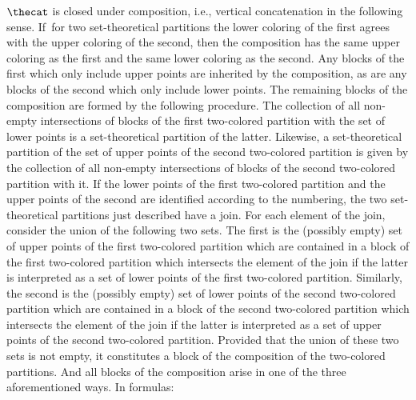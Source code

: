 \documentclass[pdftex]{sigma}
\numberwithin{equation}{section}
\begin{document}
\begin{Definition}
\begin{enumerate}
{\begin{enumerate}
{            \newcommand{\outcol}{\Yc{e}}
          \newcommand{\firstpartition}{p}
          \newcommand{\secondpartition}{q}
          \newcommand{\midsup}{s}
          \newcommand{\inblock}{\Yb{A}}
          \newcommand{\midblock}{B}
          \newcommand{\outblock}{\Yb{C}}
          \newcommand{\inind}{i}
          \newcommand{\outind}{j}
          $\thecat$ is closed under composition, i.e., vertical concatenation in the following sense. If~for two set-theoretical partitions   the lower coloring of the first agrees with the upper coloring of the second, then the composition has the same upper coloring as the first and the same lower coloring as the second. Any blocks of the first which only include upper points are inherited by the composition, as are any blocks of the second which only include lower points. The remaining blocks of the composition are formed by the following procedure. The collection of all non-empty intersections of  blocks of the first two-colored partition  with the set of lower points is a set-theoretical partition of the latter. Likewise, a set-theoretical partition of the set of upper points of the second two-colored partition is given by the collection of all non-empty intersections of blocks of the second two-colored partition with it.  If the lower points of the first two-colored partition and the upper points of the second are identified according to the numbering, the two set-theoretical partitions just described have a join. For each element of the join, consider the union  of the following two sets. The first is the (possibly empty) set of upper points of the first two-colored partition which are contained in a block of the first two-colored partition which intersects the element of the join if the latter is interpreted as a set of lower points of the first two-colored partition. Similarly, the second is the (possibly empty) set of lower points of the second two-colored partition which are contained in a block of the second two-colored partition which intersects the element of the join if the latter is interpreted as a set of upper points of the second two-colored partition. Provided that the union of these two sets is not empty, it constitutes a block of the composition of the two-colored partitions. And all blocks of the composition arise in one of the three aforementioned ways.
          In formulas:
}
\end{enumerate}}
\end{enumerate}
\end{Definition}
\end{document}

